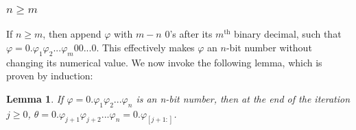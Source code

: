 \documentclass[aps,pra,showpacs,notitlepage,twocolumn,superscriptaddress,nofootinbib]{revtex4-1}
\newtheorem{lemma}[theorem]{Lemma}
\begin{document}
\subsubsection{$n \geq m$}\label{sec:n_geq_m}
If $n \geq m$, then append $\varphi$ with $m-n$ 0's after its $m^{\text{th}}$ binary decimal, such that $\varphi = 0.\varphi_1 \varphi_2 ... \varphi_m 0 0... 0$. This effectively makes $\varphi$ an $n$-bit number without changing its numerical value. We now invoke the following lemma, which is proven by induction:

\begin{lemma} \label{lemma:n_geq_m}
If $\varphi = 0.\varphi_1\varphi_2...\varphi_n$ is an n-bit number, then at the end of the iteration $j\geq 0$, $\theta = 0.\varphi_{j+1}\varphi_{j+2}...\varphi_{n} = 0.\varphi_{[j+1:]}$. 
\end{lemma}
\end{document}
